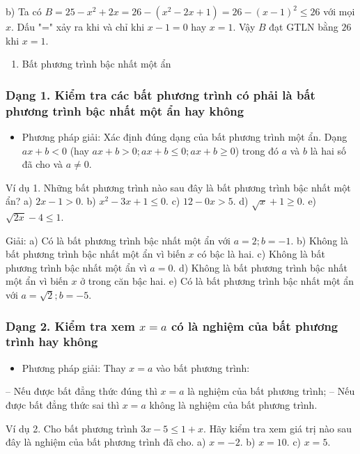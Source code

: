\documentclass[%
    fontsize=12pt,%
    chapterprefix=false,%
    open=right,%
    twoside=false,%
    numbers=noenddot,%
    headings=optiontohead,%
    final,%
    DIV=15,%
    parskip=half %
]{scrbook}
\begin{document}
b) Ta có $B = 25 - x^2 + 2x = 26 - (x^2 - 2x + 1) = 26 - (x - 1)^2 \leq 26$ với mọi $x$. Dấu "=" xảy ra khi và chỉ khi $x - 1 = 0$ hay $x = 1$. Vậy $B$ đạt GTLN bằng $26$ khi $x = 1$.

\begin{enumerate}
  \item Bất phương trình bậc nhất một ẩn
\end{enumerate}
\subsubsection{Dạng 1. Kiểm tra các bất phương trình có phải là bất phương trình bậc nhất một ẩn hay không}

\begin{itemize}
  \item Phương pháp giải: Xác định đúng dạng của bất phương trình một ẩn. Dạng $ax + b < 0$ (hay $ax + b > 0; ax + b \leq 0; ax + b \geq 0$) trong đó $a$ và $b$ là hai số đã cho và $a \neq 0$.
\end{itemize}

Ví dụ 1. Những bất phương trình nào sau đây là bất phương trình bậc nhất một ẩn? a) $2x - 1 > 0.$ b) $x^2 - 3x + 1 \leq 0.$ c) $12 - 0x > 5.$ d) $\sqrt{x} + 1 \geq 0.$ e) $\sqrt{2x} - 4 \leq 1.$


Giải: a) Có là bất phương trình bậc nhất một ẩn với $ a = 2; b = -1 $. b) Không là bất phương trình bậc nhất một ẩn vì biến $ x $ có bậc là hai. c) Không là bất phương trình bậc nhất một ẩn vì $ a = 0 $. d) Không là bất phương trình bậc nhất một ẩn vì biến $ x $ ở trong căn bậc hai. e) Có là bất phương trình bậc nhất một ẩn với $ a = \sqrt{2}; b = -5 $.
\subsubsection{Dạng 2. Kiểm tra xem $ x = a $ có là nghiệm của bất phương trình hay không}

\begin{itemize}
  \item Phương pháp giải: Thay $ x = a $ vào bất phương trình:
\end{itemize}

  -- Nếu được bất đẳng thức đúng thì $ x = a $ là nghiệm của bất phương trình;   -- Nếu được bất đẳng thức sai thì $ x = a $ không là nghiệm của bất phương trình.

Ví dụ 2. Cho bất phương trình $ 3x - 5 \leq 1 + x $. Hãy kiểm tra xem giá trị nào sau đây là nghiệm của bất phương trình đã cho.   a) $ x = -2 $.        b) $ x = 10 $.        c) $ x = 5 $.
\end{document}
